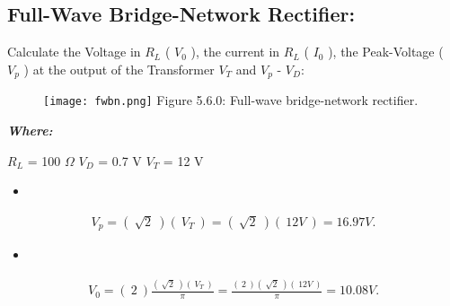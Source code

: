 \subsection{Full-Wave Bridge-Network Rectifier:}

Calculate the Voltage in $R_{L}$ ( $V_{0}$ ), the current in $R_{L}$ ( $I_{0}$ ), the Peak-Voltage ( $V_{p}$ ) at the output of the Transformer $V_{T}$ and $V_{p}$ - $V_{D}$:

\begin{figure}[H]
\texttt{[image: fwbn.png]}
\centering \linebreak \linebreak Figure 5.6.0: Full-wave bridge-network rectifier.
\end{figure}

{\bfseries\itshape Where:
\begin{tasks}
\task $R_{L}$ = 100 $\Omega$
\task $V_{D}$ = 0.7 V
\task $V_{T}$ = 12 V
\end{tasks}} \hfill

{\bfseries\itshape\color{Maroon}{Solution:}} \hfill \break

\begin{itemize}
\item {\bfseries\itshape\color{Violet}{For peak voltage at the transformer output:}} \hfill \break
{\bfseries\itshape{}}
\end{itemize}

\begin{ceqn}
\begin{align}
V_{p} = (\ \sqrt{2}\ )(\ V_{T}\ ) = (\ \sqrt{2}\ )(\ 12 V\ ) = 16.97 V.
\end{align}
\end{ceqn}

\begin{itemize}
\item {\bfseries\itshape{}} \hfill \break
{\bfseries\itshape{}}
\end{itemize}

\begin{ceqn}
\begin{align}
V_{0} = (\ 2\ )\frac{(\ \sqrt{2}\ )(\ V_{T}\ )}{\pi} = \frac{(\ 2\ )(\ \sqrt{2}\ )(\ 12 V\ )}{\pi} = 10.08 V.
\end{align}
\end{ceqn}

